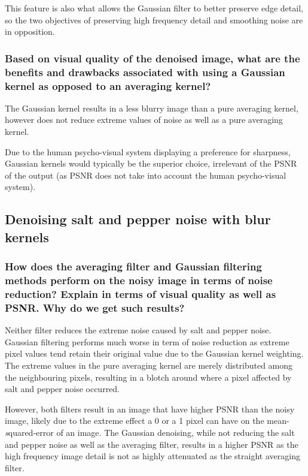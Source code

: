 This feature is also what allows the Gaussian filter to better preserve edge detail, so the two objectives of preserving high frequency detail and smoothing noise are in opposition.


\subsubsection{Based on visual quality of the denoised image, what are the benefits and drawbacks associated with using a Gaussian kernel as opposed to an averaging kernel?}
The Gaussian kernel results in a less blurry image than a pure averaging kernel, however does not reduce extreme values of noise as well as a pure averaging kernel.

Due to the human psycho-visual system displaying a preference for sharpness, Gaussian kernels would typically be the superior choice, irrelevant of the PSNR of the output (as PSNR does not take into account the human psycho-visual system).


\clearpage
\subsection{Denoising salt and pepper noise with blur kernels}


\subsubsection{How does the averaging filter and Gaussian filtering methods perform on the noisy image in terms of noise reduction? Explain in terms of visual quality as well as PSNR. Why do we get such results?}
Neither filter reduces the extreme noise caused by salt and pepper noise. Gaussian filtering performs much worse in term of noise reduction as extreme pixel values tend retain their original value due to the Gaussian kernel weighting. The extreme values in the pure averaging kernel are merely distributed among the neighbouring pixels, resulting in a blotch around where a pixel affected by salt and pepper noise occurred.

However, both filters result in an image that have higher PSNR than the noisy image, likely due to the extreme effect a 0 or a 1 pixel can have on the mean-{\emph squared}-error of an image. The Gaussian denoising, while not reducing the salt and pepper noise as well as the averaging filter, results in a higher PSNR as the high frequency image detail is not as highly attenuated as the straight averaging filter. 

